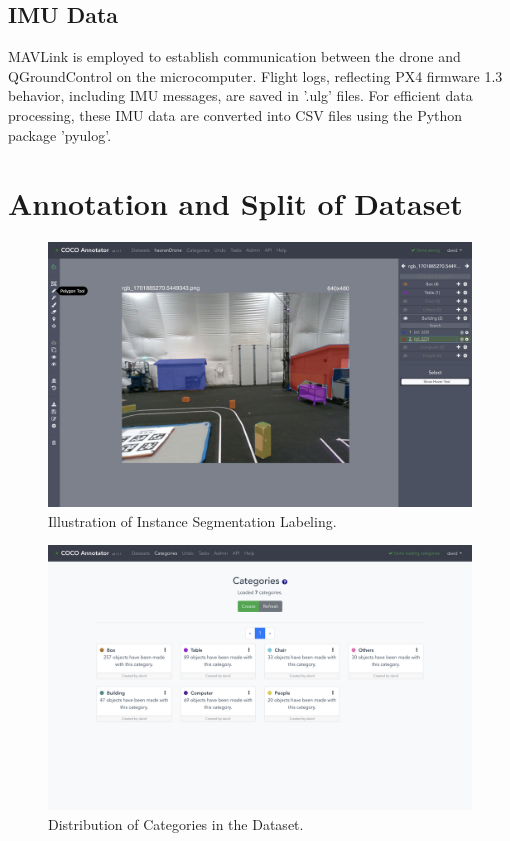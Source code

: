 \subsection{IMU Data}

MAVLink is employed to establish communication between the drone and QGroundControl on the microcomputer. Flight logs, reflecting PX4 firmware 1.3 behavior, including IMU messages, are saved in '.ulg' files. For efficient data processing, these IMU data are converted into CSV files using the Python package 'pyulog'\cite{px4_pyulog}.

\section{Annotation and Split of Dataset}

\begin{figure}[H]
    \centering
    \includegraphics[width=.8\textwidth]{Pictures/cocoannotator/polygon.png}
    \caption{Illustration of Instance Segmentation Labeling.}
    \label{fig:polygon}
\end{figure}
\begin{figure}[H]
    \centering
    \includegraphics[width=.8\textwidth]{Pictures/cocoannotator/categories.png}
    \caption{Distribution of Categories in the Dataset.}
    \label{fig:datasetinfo}
\end{figure}

